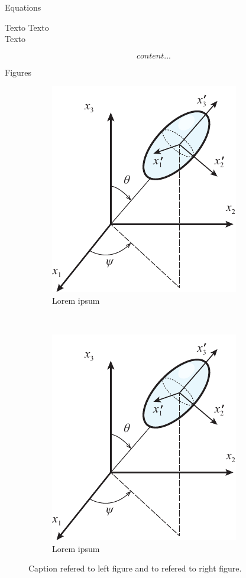 \begin{frame}{Equations}
	\begin{minipage}[t][\textheight][t]{.5\textwidth}
		\begin{block}{Texto}
			Texto\\
			Texto
		\end{block}
	\end{minipage}%
	\begin{minipage}[t][0.8\textheight][c]{.5\textwidth}
		\begin{equation}
			content...
		\end{equation}
	\end{minipage}
\end{frame}


\begin{frame}{Figures}
	\begin{figure}
		\centering
		\begin{subfigure}[t]{0.5\textwidth}
			\centering
			\includegraphics[scale=0.7]{figures/eulerang.pdf}
			\caption{Lorem ipsum}\label{fig:fig1}
		\end{subfigure}%
		~
		\begin{subfigure}[t]{0.5\textwidth}
			\centering
			\includegraphics[scale=0.7]{figures/eulerang.pdf}
			\caption{Lorem ipsum}\label{fig:fig2}
		\end{subfigure}
		\caption{Caption  refered to left figure and  to refered to right figure.}
		\label{fig:my_label}
	\end{figure}
\end{frame}

